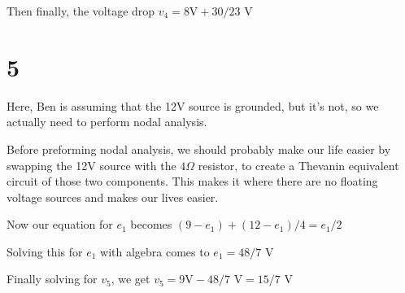 \documentclass{article}
\begin{document}
\noindent Then finally,
the voltage drop $v_4=\text{8V}+30/23\text{ V}$

\section*{5}

\noindent Here, Ben is assuming that the 12V source is grounded, but it's not, so we actually
need to perform nodal analysis.

\noindent Before preforming nodal analysis, we should probably make our life easier by
swapping the 12V source with the $4\Omega$ resistor, to create a Thevanin equivalent
circuit of those two components. This makes it where there are no floating voltage sources
and makes our lives easier.

\noindent Now our equation for $e_1$ becomes $(9-e_1)+(12-e_1)/4=e_1/2$

\noindent Solving this for $e_1$ with algebra comes to $e_1=48/7\text{ V}$

\noindent Finally solving for $v_5$, we get $v_5=9\text{V}-48/7\text{ V}=15/7\text{ V}$
\end{document}
